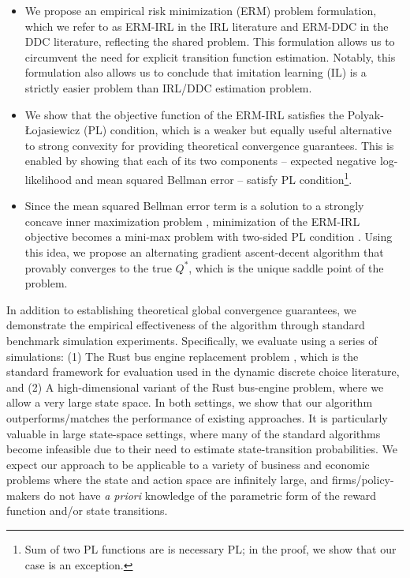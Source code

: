 \begin{itemize}[leftmargin=0.3cm]
    \item We propose an empirical risk minimization (ERM) problem formulation, which we refer to as ERM-IRL in the IRL literature and ERM-DDC in the DDC literature, reflecting the shared problem. This formulation allows us to circumvent the need for explicit transition function estimation. Notably, this formulation also allows us to conclude that imitation learning (IL) is a strictly easier problem than IRL/DDC estimation problem. 
    \item We show that the objective function of the ERM-IRL satisfies the Polyak-Łojasiewicz (PL) condition, which is a weaker but equally useful alternative to strong convexity for providing theoretical convergence guarantees. This is enabled by showing that each of its two components -- expected negative log-likelihood and mean squared Bellman error -- satisfy PL condition\footnote{Sum of two PL functions are is necessary PL; in the proof, we show that our case is an exception.}. 
    \item Since the mean squared Bellman error term is a solution to a strongly concave inner maximization problem \citep{dai2018sbeed, patterson2022generalized}, minimization of the ERM-IRL objective becomes a mini-max problem with two-sided PL condition \citep{yang2020global}. Using this idea, we propose an alternating gradient ascent-decent algorithm that provably converges to the true $Q^*$, which is the unique saddle point of the problem.
\end{itemize}
In addition to establishing theoretical global convergence guarantees, we demonstrate the empirical effectiveness of the algorithm through standard benchmark simulation experiments. 
Specifically, we evaluate using a series of simulations: (1) The Rust bus engine replacement problem \citep{rust1987optimal}, which is the standard framework for evaluation used in the dynamic discrete choice literature, and (2) A high-dimensional variant of the Rust bus-engine problem, where we allow a very large state space.
In both settings, we show that our algorithm outperforms/matches the performance of existing approaches. It is particularly valuable in large state-space settings, where many of the standard algorithms become infeasible due to their need to estimate state-transition probabilities. We expect our approach to be applicable to a variety of business and economic problems where the state and action space are infinitely large, and firms/policy-makers do not have {\it a priori} knowledge of the parametric form of the reward function and/or state transitions. 

